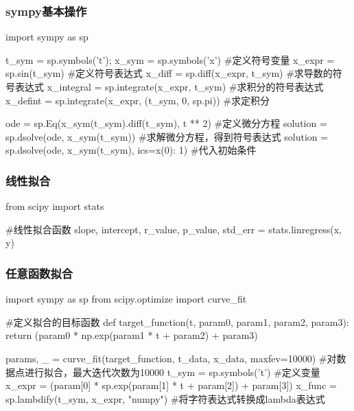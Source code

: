     \subsubsection{sympy基本操作}
      \begin{codeblock}[language=python, caption={basic function in sympy}]
        import sympy as sp

        t_sym = sp.symbols('t'); x_sym = sp.symbols('x') #定义符号变量
        x_expr = sp.sin(t_sym) #定义符号表达式
        x_diff = sp.diff(x_expr, t_sym) #求导数的符号表达式
        x_integral = sp.integrate(x_expr, t_sym) #求积分的符号表达式
        x_defint = sp.integrate(x_expr, (t_sym, 0, sp.pi)) #求定积分

        ode = sp.Eq(x_sym(t_sym).diff(t_sym), t ** 2) #定义微分方程
        solution = sp.dsolve(ode, x_sym(t_sym)) #求解微分方程，得到符号表达式
        solution = sp.dsolve(ode, x_sym(t_sym), ics={x(0): 1}) #代入初始条件
      \end{codeblock}

    \subsubsection{线性拟合}
      \begin{codeblock}[language=python, caption={linregress}]
        from scipy import stats

        #线性拟合函数
        slope, intercept, r_value, p_value, std_err = stats.linregress(x, y)
      \end{codeblock}

    \subsubsection{任意函数拟合}
      \begin{codeblock}[language=python, caption={function fitting}]
        import sympy as sp 
        from scipy.optimize import curve_fit

        #定义拟合的目标函数
        def target_function(t, param0, param1, param2, param3):
          return (param0 * np.exp(param1 * t + param2) + param3)

        params, _ = curve_fit(target_function, t_data, x_data, maxfev=10000)
          #对数据点进行拟合，最大迭代次数为10000
        t_sym = sp.symbols('t') #定义变量
        x_expr = (param[0] * sp.exp(param[1] * t + param[2]) + param[3])
        x_func = sp.lambdify(t_sym, x_expr, "numpy") #将字符表达式转换成lambda表达式
      \end{codeblock}
